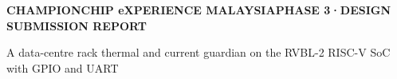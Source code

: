 \thispagestyle{empty}
\begingroup
\noindent
{\sffamily\fontsize{7.6}{9}\selectfont\color{navy}\bfseries{}%
 CHAMPIONCHIP eXPERIENCE MALAYSIA\hfill{\color{river}PHASE 3\enspace·\enspace DESIGN SUBMISSION REPORT}}\par
\vspace{2.5mm}
\noindent{\color{navy}\rule{\linewidth}{1.4pt}}\par
\vspace{22mm}

\par
\vspace{4mm}
\par
\vspace{6mm}
\noindent\begin{minipage}{0.84\linewidth}
{\sanslight\fontsize{17}{22}\selectfont\color{ink}A data-centre rack thermal and current guardian on the \mbox{RVBL-2} RISC-V SoC with GPIO and UART}
\end{minipage}\par
\vspace{15mm}

